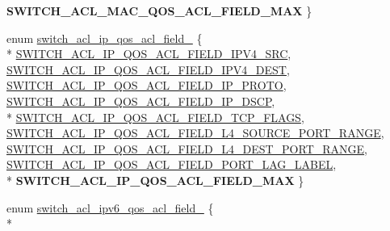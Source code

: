 \begin{DoxyCompactItemize}
{\bfseries S\+W\+I\+T\+C\+H\+\_\+\+A\+C\+L\+\_\+\+M\+A\+C\+\_\+\+Q\+O\+S\+\_\+\+A\+C\+L\+\_\+\+F\+I\+E\+L\+D\+\_\+\+M\+A\+X}
 \}
\item 
enum \hyperlink{group__ACL_ga41f645e0b1102677a2c747cb6d986ce3}{switch\+\_\+acl\+\_\+ip\+\_\+qos\+\_\+acl\+\_\+field\+\_\+} \{ \\*
\hyperlink{group__ACL_gga41f645e0b1102677a2c747cb6d986ce3a6a69043be3bfebf54f169c6cee260dd0}{S\+W\+I\+T\+C\+H\+\_\+\+A\+C\+L\+\_\+\+I\+P\+\_\+\+Q\+O\+S\+\_\+\+A\+C\+L\+\_\+\+F\+I\+E\+L\+D\+\_\+\+I\+P\+V4\+\_\+\+S\+R\+C}, 
\hyperlink{group__ACL_gga41f645e0b1102677a2c747cb6d986ce3a00b3cbc6dfe5b0e09314464edad11b21}{S\+W\+I\+T\+C\+H\+\_\+\+A\+C\+L\+\_\+\+I\+P\+\_\+\+Q\+O\+S\+\_\+\+A\+C\+L\+\_\+\+F\+I\+E\+L\+D\+\_\+\+I\+P\+V4\+\_\+\+D\+E\+S\+T}, 
\hyperlink{group__ACL_gga41f645e0b1102677a2c747cb6d986ce3af5c5085091a60036c5d88953f2b09228}{S\+W\+I\+T\+C\+H\+\_\+\+A\+C\+L\+\_\+\+I\+P\+\_\+\+Q\+O\+S\+\_\+\+A\+C\+L\+\_\+\+F\+I\+E\+L\+D\+\_\+\+I\+P\+\_\+\+P\+R\+O\+T\+O}, 
\hyperlink{group__ACL_gga41f645e0b1102677a2c747cb6d986ce3a0744cd096a3a768bf8944dc6b09f6926}{S\+W\+I\+T\+C\+H\+\_\+\+A\+C\+L\+\_\+\+I\+P\+\_\+\+Q\+O\+S\+\_\+\+A\+C\+L\+\_\+\+F\+I\+E\+L\+D\+\_\+\+I\+P\+\_\+\+D\+S\+C\+P}, 
\\*
\hyperlink{group__ACL_gga41f645e0b1102677a2c747cb6d986ce3aa6164920d472634a78f5df2d720d67a1}{S\+W\+I\+T\+C\+H\+\_\+\+A\+C\+L\+\_\+\+I\+P\+\_\+\+Q\+O\+S\+\_\+\+A\+C\+L\+\_\+\+F\+I\+E\+L\+D\+\_\+\+T\+C\+P\+\_\+\+F\+L\+A\+G\+S}, 
\hyperlink{group__ACL_gga41f645e0b1102677a2c747cb6d986ce3aa14da5678ae9a75ba5d0b168126e40e5}{S\+W\+I\+T\+C\+H\+\_\+\+A\+C\+L\+\_\+\+I\+P\+\_\+\+Q\+O\+S\+\_\+\+A\+C\+L\+\_\+\+F\+I\+E\+L\+D\+\_\+\+L4\+\_\+\+S\+O\+U\+R\+C\+E\+\_\+\+P\+O\+R\+T\+\_\+\+R\+A\+N\+G\+E}, 
\hyperlink{group__ACL_gga41f645e0b1102677a2c747cb6d986ce3a1769170f78fc660acebc088e47506fb5}{S\+W\+I\+T\+C\+H\+\_\+\+A\+C\+L\+\_\+\+I\+P\+\_\+\+Q\+O\+S\+\_\+\+A\+C\+L\+\_\+\+F\+I\+E\+L\+D\+\_\+\+L4\+\_\+\+D\+E\+S\+T\+\_\+\+P\+O\+R\+T\+\_\+\+R\+A\+N\+G\+E}, 
\hyperlink{group__ACL_gga41f645e0b1102677a2c747cb6d986ce3a92f6e520ac39a72b98fbabca659a8f80}{S\+W\+I\+T\+C\+H\+\_\+\+A\+C\+L\+\_\+\+I\+P\+\_\+\+Q\+O\+S\+\_\+\+A\+C\+L\+\_\+\+F\+I\+E\+L\+D\+\_\+\+P\+O\+R\+T\+\_\+\+L\+A\+G\+\_\+\+L\+A\+B\+E\+L}, 
\\*
{\bfseries S\+W\+I\+T\+C\+H\+\_\+\+A\+C\+L\+\_\+\+I\+P\+\_\+\+Q\+O\+S\+\_\+\+A\+C\+L\+\_\+\+F\+I\+E\+L\+D\+\_\+\+M\+A\+X}
 \}
\item 
enum \hyperlink{group__ACL_ga3a2cce0ed542240f953c53cbd4b1fc47}{switch\+\_\+acl\+\_\+ipv6\+\_\+qos\+\_\+acl\+\_\+field\+\_\+} \{ \\*

\end{DoxyCompactItemize}
